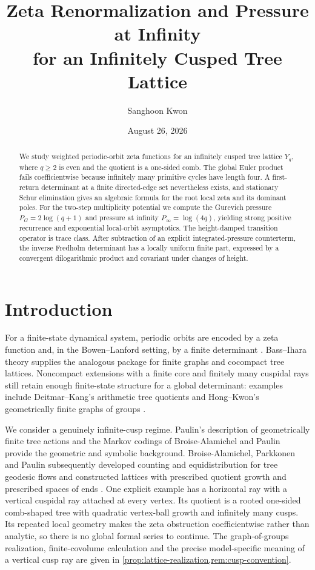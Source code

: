 \documentclass[11pt,reqno]{amsart}
\title[Zeta Renormalization and Pressure at Infinity]{Zeta Renormalization and Pressure at Infinity\\
for an Infinitely Cusped Tree Lattice}
\author{Sanghoon Kwon}
\date{August 26, 2026}
\numberwithin{equation}{section}
\theoremstyle{definition}
\theoremstyle{remark}
\begin{document}
\begin{abstract}
We study weighted periodic-orbit zeta functions for an infinitely cusped tree
lattice $Y_q$, where $q\ge2$ is even and the quotient is a one-sided comb.
The global Euler product fails
coefficientwise because infinitely many primitive cycles have length four.
A first-return determinant at a finite directed-edge set nevertheless exists,
and stationary Schur elimination gives an algebraic formula for the root local
zeta and its dominant poles.  For the two-step multiplicity potential we
compute the Gurevich pressure $P_G=2\log(q+1)$ and pressure at infinity
$P_\infty=\log(4q)$, yielding strong positive recurrence and exponential
local-orbit asymptotics.  The height-damped transition operator is trace
class.  After subtraction of an explicit integrated-pressure counterterm,
the inverse Fredholm determinant has a locally uniform finite part, expressed
by a convergent dilogarithmic product and covariant under changes of height.
\end{abstract}

\maketitle

\tableofcontents

\section{Introduction}

For a finite-state dynamical system, periodic orbits are encoded by a zeta
function and, in the Bowen--Lanford setting, by a finite determinant
\cite{BowenLanford1970}.  Bass--Ihara theory supplies the analogous package for
finite graphs and cocompact tree lattices.  Noncompact extensions with a finite
core and finitely many cuspidal rays still retain enough finite-state structure
for a global determinant: examples include Deitmar--Kang's arithmetic tree
quotients \cite{DeitmarKang2018} and Hong--Kwon's geometrically finite graphs
of groups \cite{HongKwon2025}.

We consider a genuinely infinite-cusp regime.  Paulin's description of
geometrically finite tree actions \cite{Paulin2004} and the Markov codings of
Broise-Alamichel and Paulin \cite{BroisePaulinCoding2007,BroisePaulinModular2007}
provide the geometric and symbolic background.  Broise-Alamichel, Parkkonen
and Paulin subsequently developed counting and equidistribution for tree
geodesic flows and constructed lattices with prescribed quotient growth and
prescribed spaces of ends
\cite{BroiseParkkonenPaulin2016,BroiseParkkonenPaulin2019,
BroiseParkkonenPaulin2021}.  One explicit example has a horizontal
ray with a vertical cuspidal ray attached at every vertex.  Its quotient is a
rooted one-sided comb-shaped tree with quadratic vertex-ball growth and
infinitely many cusps.  Its repeated local geometry makes the zeta obstruction
coefficientwise rather than analytic, so there is no global formal series to
continue.
The graph-of-groups realization, finite-covolume calculation and the precise
model-specific meaning of a vertical cusp ray are given in
\cref{prop:lattice-realization,rem:cusp-convention}.
\end{document}

